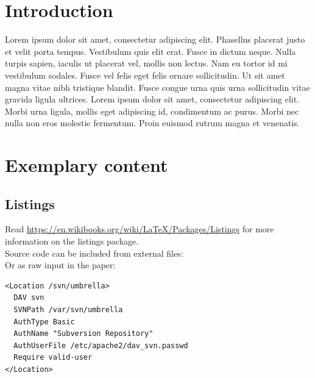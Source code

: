 \section{Introduction}

Lorem ipsum dolor sit amet, consectetur adipiscing elit. Phasellus placerat
justo et velit porta tempus. Vestibulum quis elit erat. Fusce in dictum neque.
Nulla turpis sapien, iaculis ut placerat vel, mollis non lectus. Nam eu tortor
id mi vestibulum sodales. Fusce vel felis eget felis ornare sollicitudin. Ut
sit amet magna vitae nibh tristique blandit. Fusce congue urna quis urna
sollicitudin vitae gravida ligula ultrices. Lorem ipsum dolor sit amet,
consectetur adipiscing elit. Morbi urna ligula, mollis eget adipiscing id,
condimentum ac purus. Morbi nec nulla non eros molestie fermentum. Proin
euismod rutrum magna et venenatis. 


\newpage

\section{Exemplary content}


\subsection{Listings}

Read \url{https://en.wikibooks.org/wiki/LaTeX/Packages/Listings} for more
information on the listings package.\\

Source code can be included from external files:\\



Or as raw input in the paper:\\

\begin{lstlisting}[breaklines=true,
				   frame=single,
				   caption={WebDAV configuration in
					/etc/apache2/mods-available/dav\_svn.conf},
				   label=lst:davsvn]
<Location /svn/umbrella>
  DAV svn
  SVNPath /var/svn/umbrella
  AuthType Basic
  AuthName "Subversion Repository"
  AuthUserFile /etc/apache2/dav_svn.passwd
  Require valid-user
</Location>
\end{lstlisting}


